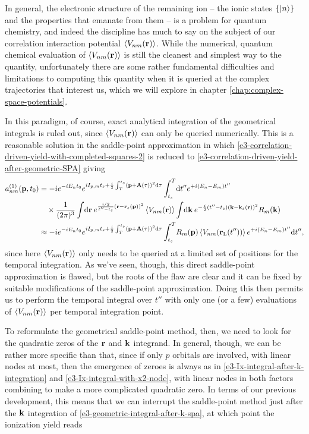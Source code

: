 In general, the electronic structure of the remaining ion -- the ionic states $\{\ket{n}\}$ and the properties that emanate from them -- is a problem for quantum chemistry, and indeed the discipline has much to say on the subject of our correlation interaction potential $\left\langle V_{nm}\mathopen{}\left( \vb{r} \right)\mathclose{} \right\rangle$. While the numerical, quantum chemical evaluation of $\left\langle V_{nm}\mathopen{}\left( \vb{r} \right)\mathclose{} \right\rangle$ is still the cleanest and simplest way to the quantity, unfortunately there are some rather fundamental difficulties and limitations to computing this quantity when it is queried at the complex trajectories that interest us, which we will explore in chapter \ref{chap:complex-space-potentials}.

In this paradigm, of course, exact analytical integration of the geometrical integrals is ruled out, since $\left\langle V_{nm}\mathopen{}\left( \vb{r} \right)\mathclose{} \right\rangle$ can only be queried numerically. This is a reasonable solution in the saddle-point approximation in which \eqref{e3-correlation-driven-yield-with-completed-squares-2} is reduced to \eqref{e3-correlation-driven-yield-after-geometric-SPA} giving
\begin{align}
a_{nm}^{(1)}(\vb{p},{t_0})
& =
-i
e^{-iE_n {t_0}}
e^{iI_{p,m} {t_s}+\frac{i}{2} \int_T^{{t_s}}\left(\vb{p}+\vb{A}(\tau)\right)^2\mathrm{d}\tau} 
\int_{{t_s}}^T\!\mathrm{d} t''
e^{+i(E_n-E_m)t''}
\nonumber \\ & \quad \times
\frac{1}{(2\pi)^{3}}
\int\!\mathrm{d}\vb{r} \:
e^{\frac{i/2}{t''-{t_s}} (\vb{r}-\vb{r}_s(\vb{p}))^2}
\left\langle V_{nm}\mathopen{}\left( \vb{r} \right)\mathclose{} \right\rangle
\int\!\mathrm{d}\vb{k}  \:
e^{-\frac i2 (t''-{t_s}) (\vb{k}-\vb{k}_s(\vb{r}))^2}
R_m(\vb{k})
\nonumber \\ & \approx
-i
e^{-iE_n {t_0}}
e^{iI_{p,m} {t_s}+\frac{i}{2} \int_T^{{t_s}}\left(\vb{p}+\vb{A}(\tau)\right)^2\mathrm{d}\tau} 
\int_{{t_s}}^T\!
R_m(\vb{p})
\left\langle V_{nm}\mathopen{}\left( \vb{r}_\mathrm{L}(t'') \right)\mathclose{} \right\rangle
e^{+i(E_n-E_m)t''}
\mathrm{d} t''
,
\end{align}
since here $\left\langle V_{nm}\mathopen{}\left( \vb{r} \right)\mathclose{} \right\rangle$ only needs to be queried at a limited set of positions for the temporal integration. As we've seen, though, this direct saddle-point approximation is flawed, but the roots of the flaw are clear and it can be fixed by suitable modifications of the saddle-point approximation. Doing this then permits us to perform the temporal integral over $t''$ with only one (or a few) evaluations of $\left\langle V_{nm}\mathopen{}\left( \vb{r} \right)\mathclose{} \right\rangle$ per temporal integration point.


To reformulate the geometrical saddle-point method, then, we need to look for the quadratic zeros of the $\vb{r}$ and $\vb{k}$ integrand. In general, though, we can be rather more specific than that, since if only $p$ orbitals are involved, with linear nodes at most, then the emergence of zeroes is always as in \eqref{e3-Ix-integral-after-k-integration} and \eqref{e3-Ix-integral-with-x2-node}, with linear nodes in both factors combining to make a more complicated quadratic zero. In terms of our previous development, this means that we can interrupt the saddle-point method just after the $\vb{k}$ integration of \eqref{e3-geometric-integral-after-k-spa}, at which point the ionization yield reads

